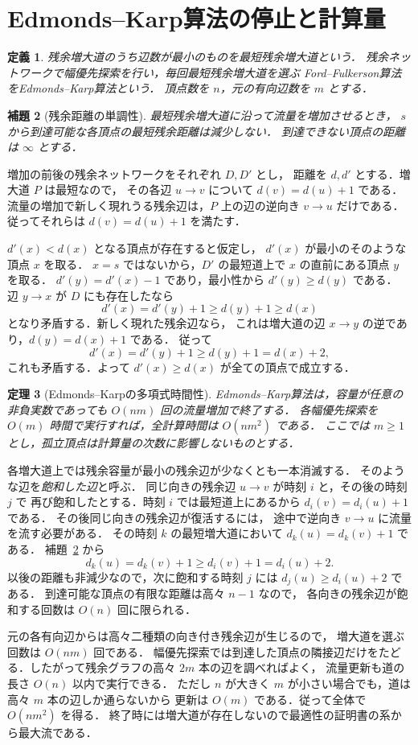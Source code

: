 \documentclass[a5paper,10pt,onecolumn]{jsarticle}
\makeatletter
\theoremstyle{mathnotetheorem}
\newtheorem{theorem}{定理}[section]
\newtheorem{definition}[theorem]{定義}
\newtheorem{lemma}[theorem]{補題}
\renewcommand{\proofname}{証明}
\renewenvironment{proof}[1][\proofname]{%
  \par\pushQED{\qed}\normalfont\topsep4\p@\@plus2\p@\relax
  \trivlist\item[\hskip\labelsep\bfseries #1]\ignorespaces
}{\popQED\endtrivlist\@endpefalse}
\makeatother
\begin{document}
\section{Edmonds--Karp算法の停止と計算量}
\begin{definition}
残余増大道のうち辺数が最小のものを\emph{最短残余増大道}という．
残余ネットワークで幅優先探索を行い，毎回最短残余増大道を選ぶ
Ford--Fulkerson算法を\emph{Edmonds--Karp算法}という．
頂点数を $n$，元の有向辺数を $m$ とする．
\end{definition}
\begin{lemma}[残余距離の単調性]\label{lem:distances}
最短残余増大道に沿って流量を増加させるとき，
$s$ から到達可能な各頂点の最短残余距離は減少しない．
到達できない頂点の距離は $\infty$ とする．
\end{lemma}
\begin{proof}
増加の前後の残余ネットワークをそれぞれ $D,D'$ とし，
距離を $d,d'$ とする．増大道 $P$ は最短なので，
その各辺 $u\to v$ について $d(v)=d(u)+1$ である．
流量の増加で新しく現れうる残余辺は，$P$ 上の辺の逆向き
$v\to u$ だけである．従ってそれらは $d(v)=d(u)+1$ を満たす．

$d'(x)<d(x)$ となる頂点が存在すると仮定し，
$d'(x)$ が最小のそのような頂点 $x$ を取る．
$x=s$ ではないから，$D'$ の最短道上で $x$ の直前にある頂点 $y$ を取る．
$d'(y)=d'(x)-1$ であり，最小性から $d'(y)\ge d(y)$ である．
辺 $y\to x$ が $D$ にも存在したなら
\[
 d'(x)=d'(y)+1\ge d(y)+1\ge d(x)
\]
となり矛盾する．新しく現れた残余辺なら，
これは増大道の辺 $x\to y$ の逆であり，$d(y)=d(x)+1$ である．
従って
\[
 d'(x)=d'(y)+1\ge d(y)+1=d(x)+2,
\]
これも矛盾する．よって $d'(x)\ge d(x)$ が全ての頂点で成立する．
\end{proof}
\begin{theorem}[Edmonds--Karpの多項式時間性]\label{thm:ek}
Edmonds--Karp算法は，容量が任意の非負実数であっても
$O(nm)$ 回の流量増加で終了する．
各幅優先探索を $O(m)$ 時間で実行すれば，全計算時間は $O(nm^2)$ である．
ここでは $m\ge1$ とし，孤立頂点は計算量の次数に影響しないものとする．
\end{theorem}
\begin{proof}
各増大道上では残余容量が最小の残余辺が少なくとも一本消滅する．
そのような辺を\emph{飽和した辺}と呼ぶ．
同じ向きの残余辺 $u\to v$ が時刻 $i$ と，その後の時刻 $j$ で
再び飽和したとする．時刻 $i$ では最短道上にあるから
$d_i(v)=d_i(u)+1$ である．
その後同じ向きの残余辺が復活するには，
途中で逆向き $v\to u$ に流量を流す必要がある．
その時刻 $k$ の最短増大道において
$d_k(u)=d_k(v)+1$ である．
補題~\ref{lem:distances} から
\[
 d_k(u)=d_k(v)+1\ge d_i(v)+1=d_i(u)+2.
\]
以後の距離も非減少なので，次に飽和する時刻 $j$ には
$d_j(u)\ge d_i(u)+2$ である．
到達可能な頂点の有限な距離は高々 $n-1$ なので，
各向きの残余辺が飽和する回数は $O(n)$ 回に限られる．

元の各有向辺からは高々二種類の向き付き残余辺が生じるので，
増大道を選ぶ回数は $O(nm)$ 回である．
幅優先探索では到達した頂点の隣接辺だけをたどる．したがって残余グラフの高々 $2m$ 本の辺を調べればよく，
流量更新も道の長さ $O(n)$ 以内で実行できる．
ただし $n$ が大きく $m$ が小さい場合でも，道は高々 $m$ 本の辺しか通らないから
更新は $O(m)$ である．従って全体で $O(nm^2)$ を得る．
終了時には増大道が存在しないので最適性の証明書の系から最大流である．
\end{proof}
\end{document}
